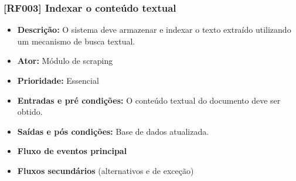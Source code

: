 \subsubsection{[RF003] Indexar o conteúdo textual}
\begin{itemize}
   \item \textbf{Descrição:} O sistema deve armazenar e indexar o texto extraído utilizando um mecanismo de busca textual.
   \item \textbf{Ator:} Módulo de scraping
   \item \textbf{Prioridade:} Essencial
   \item \textbf{Entradas e pré condições:} O conteúdo textual do documento deve ser obtido.
   \item \textbf{Saídas e pós condições:} Base de dados atualizada.
   \item \textbf{Fluxo de eventos principal}
   \item \textbf{Fluxos secundários} (alternativos e de exceção)
 \end{itemize}

